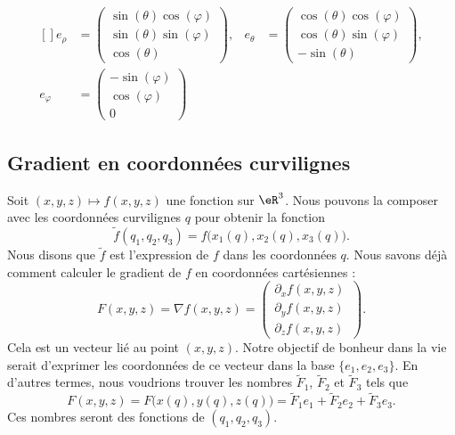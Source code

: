 \begin{equation}
	\begin{aligned}[]
		e_{\rho}    & =\begin{pmatrix}
			               \sin(\theta)\cos(\varphi) \\
			               \sin(\theta)\sin(\varphi) \\
			               \cos(\theta)
		               \end{pmatrix},
		            & e_{\theta}                   & =
		\begin{pmatrix}
			\cos(\theta)\cos(\varphi) \\
			\cos(\theta)\sin(\varphi) \\
			-\sin(\theta)
		\end{pmatrix},                      \\
		e_{\varphi} & =
		\begin{pmatrix}
			-\sin(\varphi) \\
			\cos(\varphi)  \\
			0
		\end{pmatrix}
	\end{aligned}
\end{equation}

\subsection{Gradient en coordonnées curvilignes}

Soit \( (x,y,z)\mapsto f(x,y,z)\) une fonction sur \( \eR^3\). Nous pouvons la composer avec les coordonnées curvilignes \( q\) pour obtenir la fonction
\begin{equation}
	\tilde f(q_1,q_2,q_3)=f\big( x_1(q),x_2(q),x_3(q) \big).
\end{equation}
Nous disons que \( \tilde f\) est l'expression de \( f\) dans les coordonnées \( q\). Nous savons déjà comment calculer le gradient de \( f\) en coordonnées cartésiennes :
\begin{equation}
	F(x,y, z)=\nabla f(x,y,z)=\begin{pmatrix}
		\partial_xf(x,y,z) \\
		\partial_yf(x,y,z) \\
		\partial_zf(x,y,z)    \
	\end{pmatrix}.
\end{equation}
Cela est un vecteur lié au point \( (x,y,z)\). Notre objectif de bonheur dans la vie serait d'exprimer les coordonnées de ce vecteur dans la base \( \{ e_1,e_2,e_3 \}\). En d'autres termes, nous voudrions trouver les nombres \( \tilde F_1\), \( \tilde F_2\) et \( \tilde F_3\) tels que
\begin{equation}
	F(x,y,z)=F\big( x(q),y(q),z(q) \big)=\tilde F_1e_1+\tilde F_2e_2+\tilde F_3e_3.
\end{equation}
Ces nombres seront des fonctions de \( (q_1,q_2,q_3)\).

